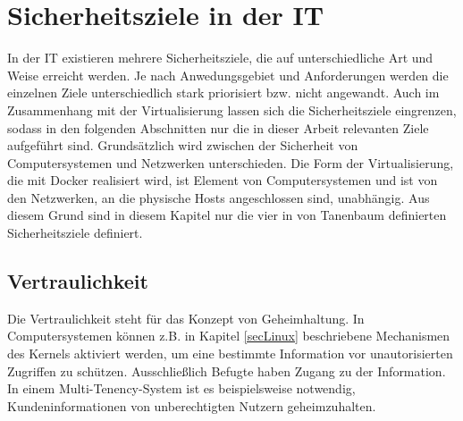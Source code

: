\documentclass[../main.tex]{subfiles}
\begin{document}

  \section{Sicherheitsziele in der IT}
  \label{introSecGoals}
		In der IT existieren mehrere Sicherheitsziele, die auf unterschiedliche Art und Weise erreicht werden. Je nach Anwedungsgebiet und Anforderungen werden die einzelnen Ziele unterschiedlich stark priorisiert bzw. nicht angewandt. Auch im Zusammenhang mit der Virtualisierung lassen sich die Sicherheitsziele eingrenzen, sodass in den folgenden Abschnitten nur die in dieser Arbeit relevanten Ziele aufgeführt sind.
		Grundsätzlich wird zwischen der Sicherheit von Computersystemen und Netzwerken unterschieden. Die Form der Virtualisierung, die mit Docker realisiert wird, ist Element von Computersystemen und ist von den Netzwerken, an die physische Hosts angeschlossen sind, unabhängig. Aus diesem Grund sind in diesem Kapitel nur die vier in \cite[S.712f.]{tanenbaumOS} von Tanenbaum definierten Sicherheitsziele definiert.






    \subsection{Vertraulichkeit}
			Die Vertraulichkeit steht für das Konzept von Geheimhaltung. In Computersystemen können z.B. in Kapitel \ref{secLinux} beschriebene Mechanismen des Kernels aktiviert werden, um eine bestimmte Information vor unautorisierten Zugriffen zu schützen. Ausschließlich Befugte haben Zugang zu der Information. In einem Multi-Tenency-System ist es beispielsweise notwendig, Kundeninformationen von unberechtigten Nutzern geheimzuhalten.
\end{document}
